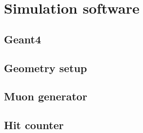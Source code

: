 
\chapter{Simulation software}
\label{ch:Simulation software}

  \section{Geant4}
  \label{ch:Simulation software:sec:Geant4}


  \section{Geometry setup}
  \label{ch:Simulation software:sec:Geometry setup}
  
  \section{Muon generator}
  \label{ch:Simulation software:sec:Muon generator}
  
  \section{Hit counter}
  \label{ch:Simulation software:sec:Hit counter}
  